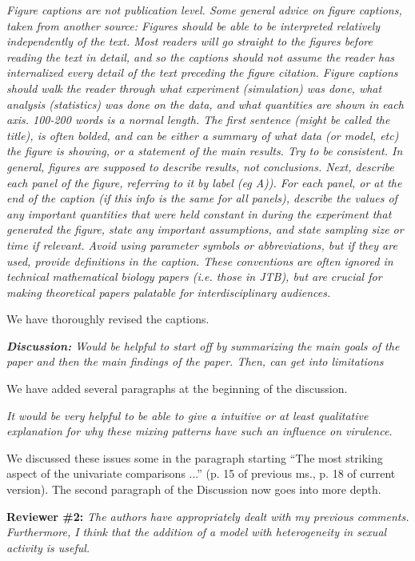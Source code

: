 \documentclass[10pt]{letter}
\newcommand{\revcomment}[1]{\emph{#1}}
\newcommand{\response}[1]{#1}
\begin{document}
\begin{letter}{
}
\revcomment{
Figure captions are not publication level. Some general advice on figure captions, taken from another source: Figures should be able to be interpreted relatively independently of the text. Most readers will go straight to the figures before reading the text in detail, and so the captions should not assume the reader has internalized every detail of the text preceding the figure citation. Figure captions should walk the reader through what experiment (simulation) was done, what analysis (statistics) was done on the data, and what quantities are shown in each axis. 100-200 words is a normal length. The first sentence (might be called the title), is often bolded, and can be either a summary of what data (or model, etc) the figure is showing, or a statement of the main results. Try to be consistent. In general, figures are supposed to describe results, not conclusions. Next, describe each panel of the figure, referring to it by label (eg A)). For each panel, or at the end of the caption (if this info is the same for all panels), describe the values of any important quantities that were held constant in during the experiment that generated the figure, state any important assumptions, and state sampling size or time if relevant. Avoid using parameter symbols or abbreviations, but if they are used, provide definitions in the caption. These conventions are often ignored in technical mathematical biology papers (i.e. those in JTB), but are crucial for making theoretical papers palatable for interdisciplinary audiences.
}

\response{
We have thoroughly revised the captions.
}

\revcomment{
\textbf{Discussion:}
Would be helpful to start off by summarizing the main goals of the paper and then the main findings of the paper. Then, can get into limitations
}
\response{
We have added several paragraphs at the beginning of the discussion.
}

\revcomment{
It would be very helpful to be able to give a intuitive or at least qualitative explanation for why these mixing patterns have such an influence on virulence.
}
\response{
We discussed these issues some in the paragraph starting ``The most striking aspect of the univariate comparisons ...'' (p. 15 of previous ms., p. 18 of current version).  The second paragraph of the Discussion now goes into more depth.

}

\textbf{Reviewer \#2:}
\revcomment{
 The authors have appropriately dealt with my previous comments. Furthermore, I think that the addition of a model with heterogeneity in sexual activity is useful.
}


\end{letter}
\end{document}
